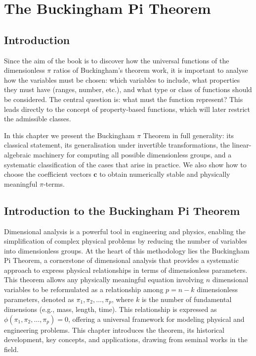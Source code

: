 \startcontents[chapter]
\chapter{The Buckingham Pi Theorem}
\label{ch:buckinghamPi}
\minitocboxed

\section*{Introduction}
Since the aim of the book is to discover how the universal functions of the dimensionless $\pi$ ratios of Buckingham's theorem work, it is important to analyse how the variables must be chosen: which variables to include, what properties they must have (ranges, number, etc.), and what type or class of functions should be considered. The central question is: what must the function represent? This leads directly to the concept of property-based functions, which will later restrict the admissible classes.

In this chapter we present the Buckingham $\pi$ Theorem in full generality: its classical statement, its generalisation under invertible transformations, the linear-algebraic machinery for computing all possible dimensionless groups, and a systematic classification of the cases that arise in practice. We also show how to choose the coefficient vectors $\mathbf{c}$ to obtain numerically stable and physically meaningful $\pi$-terms.

\section{Introduction to the Buckingham Pi Theorem}\label{ch03:BuckinghamPiTheorem}

Dimensional analysis is a powerful tool in engineering and physics, enabling the simplification of complex physical problems by reducing the number of variables into dimensionless groups. At the heart of this methodology lies the Buckingham Pi Theorem, a cornerstone of dimensional analysis that provides a systematic approach to express physical relationships in terms of dimensionless parameters. This theorem allows any physically meaningful equation involving \( n \) dimensional variables to be reformulated as a relationship among \( p = n - k \) dimensionless parameters, denoted as \(\pi_1, \pi_2, \dots, \pi_p\), where \( k \) is the number of fundamental dimensions (e.g., mass, length, time). This relationship is expressed as \(\phi(\pi_1, \pi_2, \dots, \pi_p) = 0\), offering a universal framework for modeling physical and engineering problems. This chapter introduces the theorem, its historical development, key concepts, and applications, drawing from seminal works in the field.


